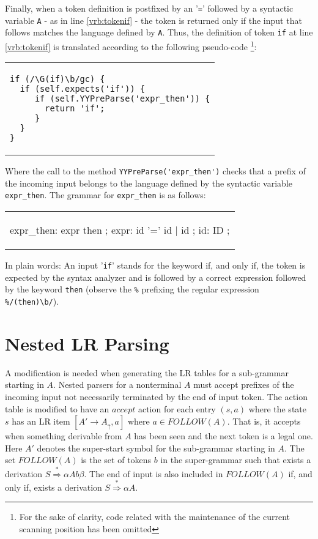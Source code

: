 Finally, when a token definition is postfixed by an '\verb|=|' followed by a syntactic variable \verb|A|
- as in line \ref{vrb:tokenif} -
the  token is returned only if the input that follows matches the language defined by \verb|A|.
Thus, the definition of token \verb|if| at line \ref{vrb:tokenif} is translated according to the following pseudo-code \footnote{For the sake of 
clarity, code related with the maintenance of the current scanning position has been omitted}:
\begin{center}
\begin{tabular}{p{121mm}}
\begin{verbatim}
if (/\G(if)\b/gc) {
  if (self.expects('if')) {
     if (self.YYPreParse('expr_then')) {
       return 'if';
     }
  }
}
\end{verbatim}
\end{tabular}
\end{center}
Where the call to the method \verb|YYPreParse('expr_then')| checks that a prefix of the incoming input 
belongs to the language defined by the syntactic variable \verb|expr_then|.
The grammar for \verb|expr_then| is as follows:
\begin{center}
\begin{tabular}{p{57mm}}
\begin{VERBATIM}
expr_then: expr then      ; 
expr:      id '=' id | id ; 
id:        ID             ;
\end{VERBATIM}
\end{tabular}
\end{center}
In plain words: An input '\verb|if|' stands for the keyword if, and only if, the token is expected by the syntax analyzer
and is followed by a correct expression followed by the keyword \verb|then| (observe the \verb|%| prefixing the regular expression
\verb|%/(then)\b/|).

\section{Nested LR Parsing}
\label{section:nestedlrparsing}

A modification is needed when generating the LR tables for a sub-grammar starting in $A$.
Nested parsers for a nonterminal $A$ must accept prefixes  of the incoming input not necessarily
terminated by the end of input token. The action table is modified to have an $accept$ action 
for each entry $(s, a)$
where the state $s$ has an LR item $[A' \rightarrow A_\uparrow , a]$ where $a \in FOLLOW(A)$.
That is, it accepts when something derivable from $A$ has been seen and the next token is a legal one.
Here $A'$ denotes the super-start symbol for the sub-grammar starting in $A$. The set $FOLLOW(A)$ 
is the set of tokens $b$ in the super-grammar such that exists a derivation 
$S  \stackrel{*}{\Longrightarrow}  \alpha A b \beta$.
The end of input is also included in $FOLLOW(A)$ if, and only if,
exists a derivation $S \stackrel{*}{\Longrightarrow} \alpha A$.

